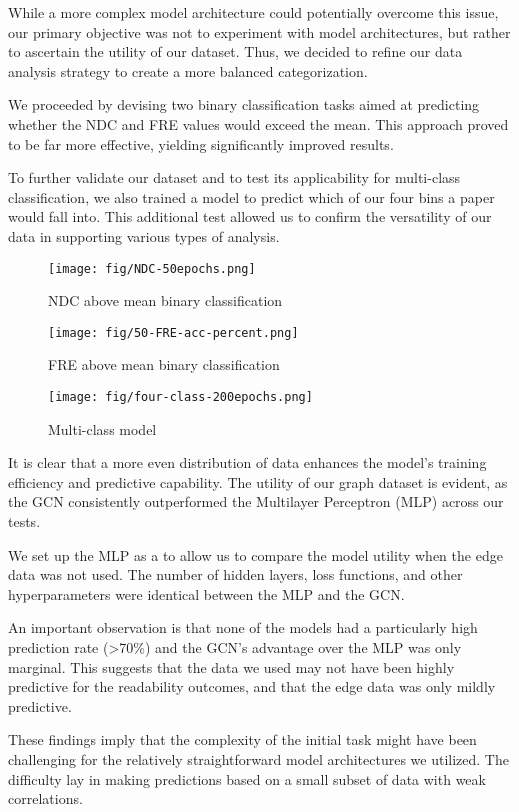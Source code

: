 \documentclass[final]{article}
\begin{document}
While a more complex model architecture could potentially overcome this issue, our primary objective was not to experiment with model architectures, but rather to ascertain the utility of our dataset. Thus, we decided to refine our data analysis strategy to create a more balanced categorization.

We proceeded by devising two binary classification tasks aimed at predicting whether the NDC and FRE values would exceed the mean. This approach proved to be far more effective, yielding significantly improved results.

To further validate our dataset and to test its applicability for multi-class classification, we also trained a model to predict which of our four bins a paper would fall into. This additional test allowed us to confirm the versatility of our data in supporting various types of analysis.
\FloatBarrier
 \begin{figure}[!hbt]
  \centering
   \texttt{[image: fig/NDC-50epochs.png]}
  \caption{NDC above mean binary classification}
 \end{figure} 
   \begin{figure}[!hbr]
  \centering
    \texttt{[image: fig/50-FRE-acc-percent.png]}
    \caption{FRE above mean binary classification}
 \end{figure} 
   \begin{figure}[!hbr]
  \centering
 \texttt{[image: fig/four-class-200epochs.png]}
  \caption{Multi-class model}
 \end{figure} 
 \FloatBarrier
 It is clear that a more even distribution of data enhances the model's training efficiency and predictive capability. The utility of our graph dataset is evident, as the GCN consistently outperformed the Multilayer Perceptron (MLP) across our tests.

We set up the MLP as a to allow us to compare the model utility when the edge data was not used. The number of hidden layers, loss functions, and other hyperparameters were identical between the MLP and the GCN. 

An important observation is that none of the models had a particularly high prediction rate (>70\%) and the GCN's advantage over the MLP was only marginal. This suggests that the data we used may not have been highly predictive for the readability outcomes, and that the edge data was only mildly predictive.

These findings imply that the complexity of the initial task might have been challenging for the relatively straightforward model architectures we utilized. The difficulty lay in making predictions based on a small subset of data with weak correlations.
\end{document}
